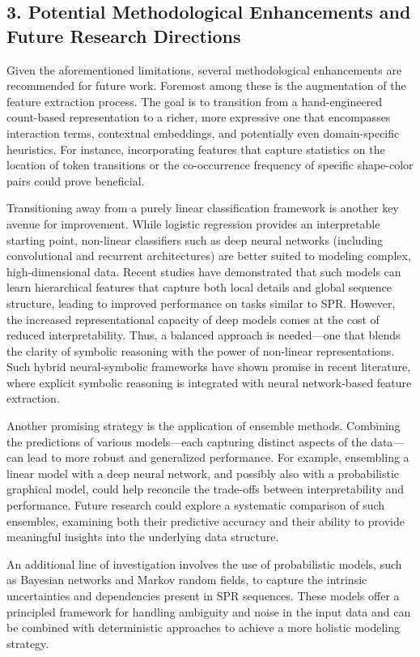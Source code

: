 \documentclass{article}
\begin{document}
\subsection*{3. Potential Methodological Enhancements and Future Research Directions}
Given the aforementioned limitations, several methodological enhancements are recommended for future work. Foremost among these is the augmentation of the feature extraction process. The goal is to transition from a hand-engineered count-based representation to a richer, more expressive one that encompasses interaction terms, contextual embeddings, and potentially even domain-specific heuristics. For instance, incorporating features that capture statistics on the location of token transitions or the co-occurrence frequency of specific shape-color pairs could prove beneficial.

Transitioning away from a purely linear classification framework is another key avenue for improvement. While logistic regression provides an interpretable starting point, non-linear classifiers such as deep neural networks (including convolutional and recurrent architectures) are better suited to modeling complex, high-dimensional data. Recent studies have demonstrated that such models can learn hierarchical features that capture both local details and global sequence structure, leading to improved performance on tasks similar to SPR. However, the increased representational capacity of deep models comes at the cost of reduced interpretability. Thus, a balanced approach is needed—one that blends the clarity of symbolic reasoning with the power of non-linear representations. Such hybrid neural-symbolic frameworks have shown promise in recent literature, where explicit symbolic reasoning is integrated with neural network-based feature extraction.

Another promising strategy is the application of ensemble methods. Combining the predictions of various models—each capturing distinct aspects of the data—can lead to more robust and generalized performance. For example, ensembling a linear model with a deep neural network, and possibly also with a probabilistic graphical model, could help reconcile the trade-offs between interpretability and performance. Future research could explore a systematic comparison of such ensembles, examining both their predictive accuracy and their ability to provide meaningful insights into the underlying data structure.

An additional line of investigation involves the use of probabilistic models, such as Bayesian networks and Markov random fields, to capture the intrinsic uncertainties and dependencies present in SPR sequences. These models offer a principled framework for handling ambiguity and noise in the input data and can be combined with deterministic approaches to achieve a more holistic modeling strategy.
\end{document}

